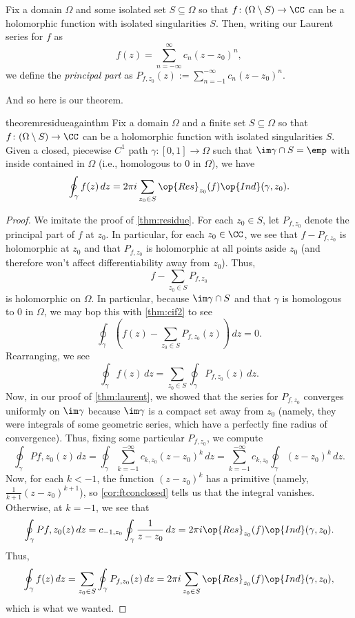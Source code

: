 \begin{definition}[Residue]
	Fix a domain $\Omega$ and some isolated set $S\subseteq\Omega$ so that $f\colon(\Omega\setminus S)\to\CC$ can be a holomorphic function with isolated singularities $S$. Then, writing our Laurent series for $f$ as
	\[f(z)=\sum_{n=-\infty}^\infty c_n(z-z_0)^n,\]
	we define the \textit{principal part} as $P_{f,z_0}(z):=\sum_{n=-1}^{-\infty} c_n(z-z_0)^n$.
\end{definition}
And so here is our theorem.
\begin{restatable}[Residue]{theorem}{residueagainthm} \label{thm:residue2}
	Fix a domain $\Omega$ and a finite set $S\subseteq\Omega$ so that $f\colon(\Omega\setminus S)\to\CC$ can be a holomorphic function with isolated singularities $S$. Given a closed, piecewise $C^1$ path $\gamma\colon[0,1]\to\Omega$ such that $\im\gamma\cap S=\emp$ with inside contained in $\Omega$ (i.e., homologous to $0$ in $\Omega$), we have
	\[\oint_\gamma f(z)\,dz=2\pi i\sum_{z_0\in S}\op{Res}_{z_0}(f)\op{Ind}(\gamma,z_0).\]
\end{restatable}
\begin{proof}
	We imitate the proof of \autoref{thm:residue}. For each $z_0\in S$, let $P_{f,z_0}$ denote the principal part of $f$ at $z_0$. In particular, for each $z_0\in\CC$, we see that $f-P_{f,z_0}$ is holomorphic at $z_0$ and that $P_{f,z_0}$ is holomorphic at all points aside $z_0$ (and therefore won't affect differentiability away from $z_0$). Thus,
	\[f-\sum_{z_0\in S}P_{f,z_0}\]
	is holomorphic on $\Omega$. In particular, because $\im\gamma\cap S$ and that $\gamma$ is homologous to $0$ in $\Omega$, we may bop this with \autoref{thm:cif2} to see
	\[\oint_\gamma\left(f(z)-\sum_{z_0\in S}P_{f,z_0}(z)\right)\,dz=0.\]
	Rearranging, we see
	\[\oint_\gamma f(z)\,dz=\sum_{z_0\in S}\oint_\gamma P_{f,z_0}(z)\,dz.\]
	Now, in our proof of \autoref{thm:laurent}, we showed that the series for $P_{f,z_0}$ converges uniformly on $\im\gamma$ because $\im\gamma$ is a compact set away from $z_0$ (namely, they were integrals of some geometric series, which have a perfectly fine radius of convergence). Thus, fixing some particular $P_{f,z_0}$, we compute
	\[\oint_\gamma P{f,z_0}(z)\,dz = \oint_\gamma\sum_{k=-1}^{-\infty}c_{k,z_0}(z-z_0)^k\,dz = \sum_{k=-1}^{-\infty}c_{k,z_0}\oint_\gamma (z-z_0)^k\,dz.\]
	Now, for each $k<-1$, the function $(z-z_0)^k$ has a primitive (namely, $\frac1{k+1}(z-z_0)^{k+1}$), so \autoref{cor:ftconclosed} tells us that the integral vanishes. Otherwise, at $k=-1$, we see that
	\[\oint_\gamma P{f,z_0}(z)\,dz = c_{-1,z_0}\oint_\gamma\frac1{z-z_0}\,dz=2\pi i\op{Res}_{z_0}(f)\op{Ind}(\gamma,z_0).\]
	Thus,
	\[\oint_\gamma f(z)\,dz=\sum_{z_0\in S}\oint_\gamma P_{f,z_0}(z)\,dz=2\pi  i\sum_{z_0\in S}\op{Res}_{z_0}(f)\op{Ind}(\gamma,z_0),\]
	which is what we wanted.
\end{proof}

